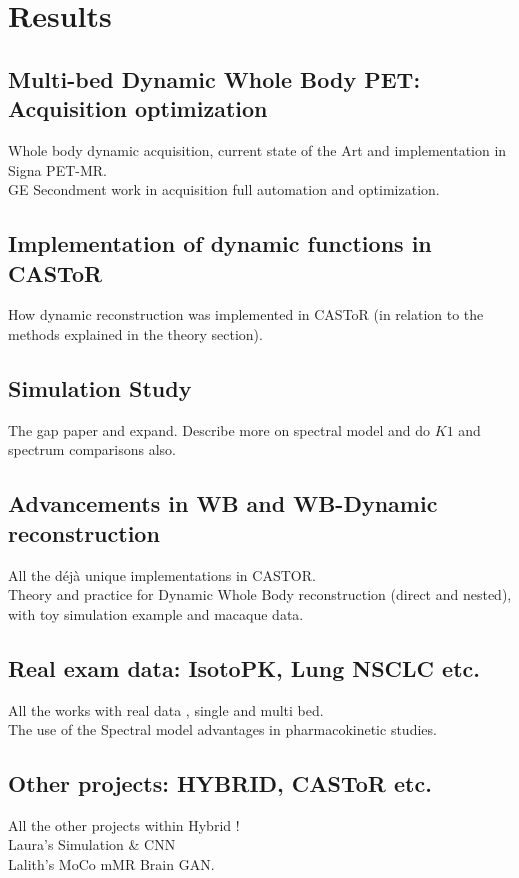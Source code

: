 \chapter{Results}


\section{Multi-bed Dynamic Whole Body PET: Acquisition optimization}
Whole body dynamic acquisition, current state of the Art and implementation in Signa PET-MR. \\
GE Secondment work in acquisition full automation and optimization. \\



\section{Implementation of dynamic functions in CASToR }
How dynamic reconstruction was implemented in CASToR (in relation to the methods explained in the theory section). \\


\section{Simulation Study}
The gap paper and expand. Describe more on spectral model and do $K1$ and spectrum comparisons also. \\

\section{Advancements in WB and WB-Dynamic reconstruction}
All the déjà unique implementations in CASTOR. \\
Theory and practice for Dynamic Whole Body reconstruction (direct and nested), with toy simulation example and macaque data. \\

\section{Real exam data: IsotoPK, Lung NSCLC etc.}
All the works with real data , single and multi bed.  \\ 
The use of the Spectral model advantages in pharmacokinetic studies. \\

\section{Other projects: HYBRID, CASToR etc.}
All the other projects within Hybrid ! \\
Laura's Simulation & CNN \\
Lalith's MoCo mMR Brain GAN.
